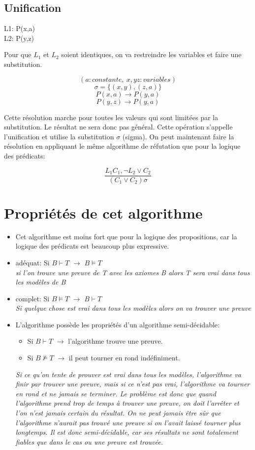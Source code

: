 {\subsection{Unification}
\begin{minipage}{0.25\textwidth}
		L1:  P(x,a)\\
		L2:  P(y,z)
\end{minipage}
\begin{minipage}{0.75\textwidth}
		Pour que $L_1$ et $L_2$ soient identiques, on va restreindre les variables et faire une substitution.
\end{minipage}

$$(a: constante,\ x,yz:variables)$$
$$\sigma=\{(x,y),(z,a)\}$$
$$P(x,a) \to P(y,a)$$
$$P(y,z) \to P(y,a)$$

Cette résolution marche pour toutes les valeurs qui sont limitées par la substitution. Le résultat ne sera donc pas général.
Cette opération s'appelle l'unification et utilise la substitution $\sigma$ (sigma). 
On peut maintenant faire la résolution en appliquant  le même algorithme de réfutation que pour la logique des prédicats: 

$$\frac{L_1C_1, \neg L_2 \lor C_2}{(C_1 \lor C_2)\sigma}$$

\section{Propriétés de cet algorithme}
\begin{itemize}
\item Cet algorithme est moins fort que pour la logique des propositions, car la logique des prédicats est beaucoup plus expressive.
\item  adéquat: Si $B\vdash T$ $\to$ $B \models T$\\
\textit{si l'on trouve une preuve de T avec les axiomes B alors T sera vrai dans tous les modèles de B}
\item complet: Si $B \models T$ $\to$ $B\vdash T$\\
\textit{Si quelque chose est vrai dans tous les modèles alors on va trouver une preuve}
\item L'algorithme possède les propriétés d'un algorithme semi-décidable:
\begin{itemize}
\item Si $B \vdash T$ $\to$ l'algorithme trouve une preuve. 
\item Si $B  \nvDash T$ $\to$ il peut tourner en rond indéfiniment.
\end{itemize}
\textit{Si ce qu'on tente de prouver est vrai dans tous les modèles, l'algorithme va finir par trouver une preuve, mais si ce n'est pas vrai, l'algorithme va tourner en rond et ne jamais se terminer. Le problème est donc que quand l'algorithme prend trop de temps à trouver une preuve, on doit l'arrêter et l'on n'est jamais certain du résultat. On ne peut jamais être sûr que l'algorithme n'aurait pas trouvé une preuve si on l'avait laissé tourner plus longtemps. Il est donc semi-décidable, car ses résultats ne sont totalement fiables que dans le cas ou une preuve est trouvée. }
\end{itemize}
}
